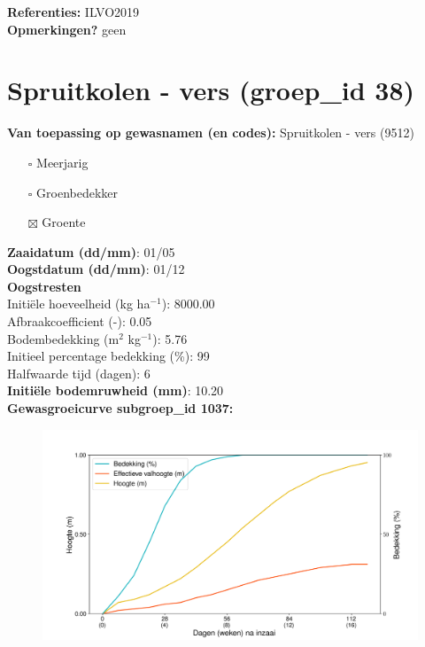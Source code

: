 \documentclass{article}
\begin{document}
  \textbf{Referenties:} ILVO2019 \vspace{0.10cm} \\ 
  \textbf{Opmerkingen?} geen \vspace{0.10cm} \\ 
 \newpage 
 \section{Spruitkolen - vers (groep\_id 38)} 
 \textbf{Van toepassing op gewasnamen (en codes):} Spruitkolen - vers (9512) 
 \begin{multicols}{3} \begin{itemize} \item[$\square$] Meerjarig \item[$\square$] Groenbedekker \item[$\boxtimes$] Groente \end{itemize} \end{multicols} 
  \textbf{Zaaidatum (dd/mm)}: 01/05  \vspace{0.10cm} \\ 
  \textbf{Oogstdatum (dd/mm)}: 01/12  \vspace{0.10cm} \\ 
  \textbf{Oogstresten} \vspace{0.05cm} \\ 
  \tab Initi\"{e}le hoeveelheid (kg ha$^{-1}$): 8000.00 \vspace{0.05cm} \\ 
  \tab Afbraakcoefficient (-): 0.05 \vspace{0.05cm} \\ 
  \tab Bodembedekking (m$^2$ kg$^{-1}$): 5.76 \vspace{0.05cm} \\ 
  \tab Initieel percentage bedekking (\%): 99 \vspace{0.05cm} \\ 
  \tab Halfwaarde tijd (dagen): 6 \vspace{0.05cm} \\ 
  \textbf{Initi\"{e}le bodemruwheid (mm)}: 10.20 \vspace{0.05cm} \\ 
  \textbf{Gewasgroeicurve subgroep\_id 1037:} 
 \begin{center} \begin{figure}[H] \includegraphics[width=12.5cm]{temp/1037.png} \end{figure} \end{center} 
\end{document}
